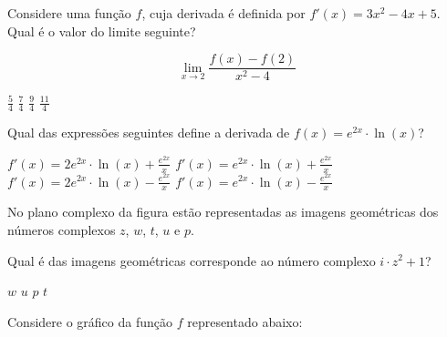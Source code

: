 \documentclass[12pt,a4paper]{exam}
\begin{document}
\begin{questions}

\question
Considere uma função \( f\), cuja derivada é definida por \( f'(x) = 3x^2 - 4x + 5 \). Qual é o valor do limite seguinte?

\[
\lim_{x \to 2} \frac{f(x) - f(2)}{x^2 - 4}
\]

\begin{choices}
    \choice \(\frac{5}{4}\)
    \choice \(\frac{7}{4}\)
    \choice \(\frac{9}{4}\)
    \choice \(\frac{11}{4}\)
\end{choices}

\question
Qual das expressões seguintes define a derivada de $f(x) = e^{2x} \cdot \ln(x)$?
\begin{choices}
    \choice $f'(x) = 2e^{2x} \cdot \ln(x) + \frac{e^{2x}}{x}$
    \choice $f'(x) = e^{2x} \cdot \ln(x) + \frac{e^{2x}}{x}$
    \choice $f'(x) = 2e^{2x} \cdot \ln(x) - \frac{e^{2x}}{x}$
    \choice $f'(x) = e^{2x} \cdot \ln(x) - \frac{e^{2x}}{x}$
\end{choices}

\question
No plano complexo da figura estão representadas as imagens geométricas dos números complexos \( z \), \( w \), \( t \), \( u \) e \( p \).

\begin{center}
\end{center}

Qual é das imagens geométricas corresponde ao número complexo \( i\cdot z^2 + 1 \)?

\begin{choices}
    \choice \(w\)
    \choice \(u\)
    \choice \(p\)
    \choice \(t\)
\end{choices}

\question
Considere o gráfico da função \( f \) representado abaixo:

\begin{center}
\end{center}


\end{questions}
\end{document}
